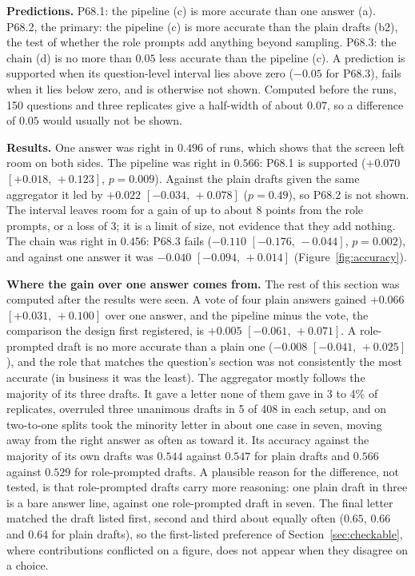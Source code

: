 \documentclass[10pt,twocolumn]{article}
\newcommand{\ci}[2]{\ensuremath{[#1,\,#2]}}
\begin{document}
\textbf{Predictions.} P68.1: the pipeline (c) is more accurate than one
answer (a). P68.2, the primary: the pipeline (c) is more accurate than
the plain drafts (b2), the test of whether the role prompts add
anything beyond sampling. P68.3: the chain (d) is no more than $0.05$
less accurate than the pipeline (c). A prediction is supported when its
question-level interval lies above zero ($-0.05$ for P68.3), fails when
it lies below zero, and is otherwise not shown. Computed before the
runs, 150 questions and three replicates give a half-width of about
$0.07$, so a difference of $0.05$ would usually not be shown.

\textbf{Results.} One answer was right in $0.496$ of runs, which shows
that the screen left room on both sides. The pipeline was right in
$0.566$: P68.1 is supported ($+0.070$ \ci{+0.018}{+0.123}, $p=0.009$).
Against the plain drafts given the same aggregator it led by $+0.022$
\ci{-0.034}{+0.078} ($p=0.49$), so P68.2 is not shown. The interval
leaves room for a gain of up to about 8 points from the role prompts,
or a loss of 3; it is a limit of size, not evidence that they add
nothing. The chain was right in $0.456$: P68.3 fails ($-0.110$
\ci{-0.176}{-0.044}, $p=0.002$), and against one answer it was $-0.040$
\ci{-0.094}{+0.014} (Figure~\ref{fig:accuracy}).

\textbf{Where the gain over one answer comes from.} The rest of this
section was computed after the results were seen. A vote of four plain
answers gained $+0.066$ \ci{+0.031}{+0.100} over one answer, and the
pipeline minus the vote, the comparison the design first registered, is
$+0.005$ \ci{-0.061}{+0.071}. A role-prompted draft is no more accurate
than a plain one ($-0.008$ \ci{-0.041}{+0.025}), and the role that
matches the question's section was not consistently the most accurate
(in business it was the least). The
aggregator mostly follows the majority of its three drafts. It gave a
letter none of them gave in 3 to 4\% of replicates, overruled three
unanimous drafts in 5 of 408 in each setup, and on two-to-one splits
took the minority letter in about one case in seven, moving away from
the right answer as often as toward it. Its accuracy against the
majority of its own drafts was $0.544$ against $0.547$ for plain drafts
and $0.566$ against $0.529$ for role-prompted drafts. A plausible reason
for the difference, not tested, is that role-prompted drafts carry more
reasoning: one plain draft in three is a bare answer line, against one
role-prompted draft in seven. The final letter matched the draft listed
first, second and third about equally often ($0.65$, $0.66$ and $0.64$
for plain drafts), so the first-listed preference of
Section~\ref{sec:checkable}, where contributions conflicted on a
figure, does not appear when they disagree on a choice.
\end{document}
